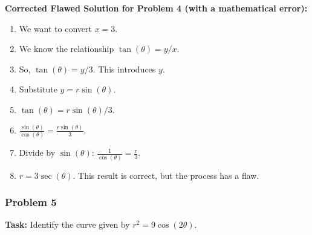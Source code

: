 \documentclass{article}
\begin{document}
\textbf{Corrected Flawed Solution for Problem 4 (with a mathematical error):}
\begin{enumerate}
    \item We want to convert \(x=3\).
    \item We know the relationship \( \tan(\theta) = y/x \).
    \item So, \( \tan(\theta) = y/3 \). This introduces \(y\).
    \item Substitute \( y = r\sin(\theta) \).
    \item \( \tan(\theta) = r\sin(\theta)/3 \).
    \item \( \frac{\sin(\theta)}{\cos(\theta)} = \frac{r\sin(\theta)}{3} \).
    \item Divide by \(\sin(\theta)\): \( \frac{1}{\cos(\theta)} = \frac{r}{3} \).
    \item \( r = 3\sec(\theta) \). This result is correct, but the process has a flaw.
\end{enumerate}

\subsubsection*{Problem 5}
\textbf{Task:} Identify the curve given by \(r^2 = 9\cos(2\theta)\).
\end{document}
